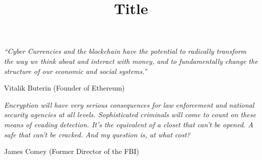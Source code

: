 \documentclass[a4paper, 11pt, oneside]{Thesis}  %
\begin{document}
\frontmatter      %

\title  {Title}

\addresses  {\groupname\\\deptname\\\univname}  %

\maketitle


\fancyhead{}  %
\rhead{\thepage}  %
\lhead{}  %

\pagestyle{fancy}  %

\pagestyle{empty}  %

\null\vfill
\textit{“Cyber Currencies and the blockchain have the potential to radically transform the way we think about and interact with money, and to fundamentally change the structure of our economic and social systems.”}

\begin{flushright}
	Vitalik Buterin (Founder of Ethereum)
\end{flushright}

\null\vfill
\textit{Encryption will have very serious consequences for law enforcement and national security agencies at all levels. Sophisticated criminals will come to count on these means of evading detection. It’s the equivalent of a closet that can’t be opened. A safe that can’t be cracked. And my question is, at what cost?}

\begin{flushright}
	James Comey (Former Director of the FBI)
\end{flushright}
\end{document}
